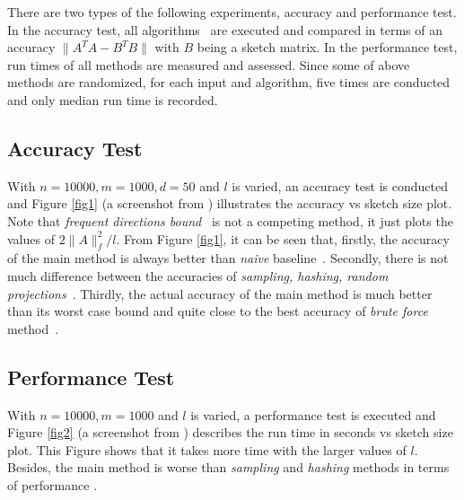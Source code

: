 \documentclass{acm_proc_article-sp}
\begin{document}
There are two types of the following experiments, accuracy and performance test. In the accuracy test, all algorithms~\cite{ref1} are executed and compared in terms of an accuracy $\|A^TA - B^TB\|$ with $B$ being a sketch matrix. In the performance test, run times of all methods are measured and assessed. Since some of above methods are randomized, for each input and algorithm, five times are conducted and only median run time is recorded.

\subsection{Accuracy Test}

With $n = 10000, m = 1000, d = 50$ and $l$ is varied, an accuracy test is conducted and Figure \ref{fig1} (a screenshot from \cite{ref1}) illustrates the accuracy vs sketch size plot. Note that \textit{frequent directions bound}~\cite{ref1} is not a competing method, it just plots the values of $2\|A\|_{f}^2/l$. From Figure \ref{fig1}, it can be seen that, firstly, the accuracy of the main method is always better than \textit{naive} baseline~\cite{ref1}. Secondly, there is not much difference between the accuracies of \textit{sampling, hashing, random projections}~\cite{ref1}. Thirdly, the actual accuracy of the main method is much better than its worst case bound and quite close to the best accuracy of \textit{brute force} method~\cite{ref1}.


\subsection{Performance Test}

With $n = 10000, m = 1000$ and $l$ is varied, a performance test is executed and Figure \ref{fig2} (a screenshot from \cite{ref1}) describes the run time in seconds vs sketch size plot. This Figure shows that it takes more time with the larger values of $l$. Besides, the main method is worse than \textit{sampling} and \textit{hashing} methods in terms of performance \cite{ref1}.

\end{document}
